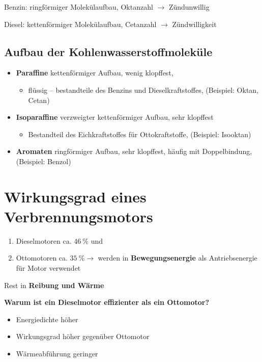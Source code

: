 Benzin: ringförmiger Molekülaufbau, Oktanzahl $\to$ Zündunwillig

Diesel: kettenförmiger Molekülaufbau, Cetanzahl $\to$ Zündwilligkeit

\subsection{Aufbau der
Kohlenwasserstoffmoleküle}\label{aufbau-der-kohlenwasserstoffmolekuele}

\begin{itemize}
\item
  \textbf{Paraffine} kettenförmiger Aufbau, wenig klopffest,

  \begin{itemize}
  \item
    flüssig -- bestandteile des Benzins und Dieselkraftstoffes,
    (Beispiel: Oktan, Cetan)
  \end{itemize}
\item
  \textbf{Isoparaffine} verzweigter kettenförmiger Aufbau, sehr
  klopffest

  \begin{itemize}
  \item
    Bestandteil des Eichkraftstoffes für Ottokraftstoffe, (Beispiel:
    Isooktan)
  \end{itemize}
\item
  \textbf{Aromaten} ringförmiger Aufbau, sehr klopffest, häufig mit
  Doppelbindung, (Beispiel: Benzol)
\end{itemize}

\section{Wirkungsgrad eines
Verbrennungsmotors}\label{wirkungsgrad-eines-verbrennungsmotors}

\begin{enumerate}
\item
  Dieselmotoren ca. $46~\%$ und
\item
  Ottomotoren ca. $35~\% \to$ werden in \textbf{Bewegungsenergie} als
  Antriebsenergie für Motor verwendet
\end{enumerate}

Rest in \textbf{Reibung und Wärme}

\textbf{Warum ist ein Dieselmotor effizienter als ein Ottomotor?}

\begin{itemize}
\item
  Energiedichte höher
\item
  Wirkungsgrad höher gegenüber Ottomotor
\item
  Wärmeabführung geringer
\end{itemize}


